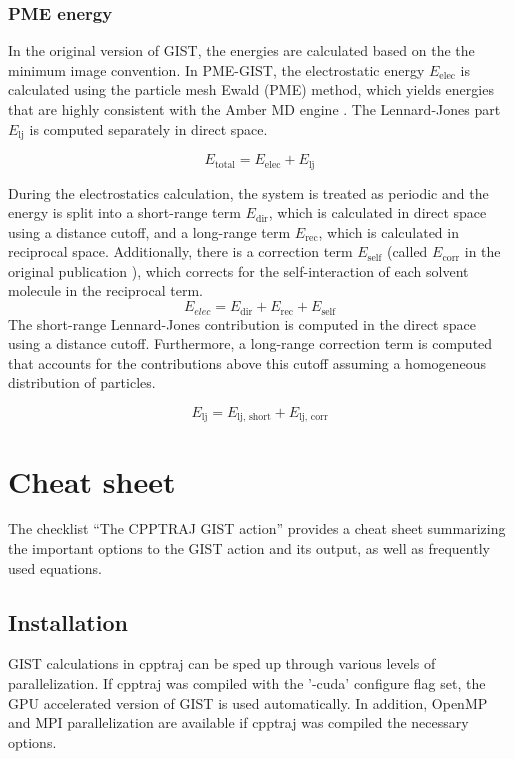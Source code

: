 \documentclass[9pt,tutorial]{livecoms}
\begin{document}
\subsubsection{PME energy}

In the original version of GIST, the energies are calculated based on the the minimum image convention.
In PME-GIST, the electrostatic energy $E_\text{elec}$ is calculated using the particle mesh Ewald (PME) method, which yields energies that are highly consistent with the Amber MD engine \cite{Chen2021}.
The Lennard-Jones part $E_\text{lj}$ is computed separately in direct space.

\begin{equation}
	E_\text{total} = E_\text{elec} + E_\text{lj}
\end{equation}

During the electrostatics calculation, the system is treated as periodic and the energy is split into a short-range term $E_\text{dir}$, which is calculated in direct space using a distance cutoff, and a long-range term $E_\text{rec}$, which is calculated in reciprocal space.
Additionally, there is a correction term $E_\text{self}$ (called $E_\text{corr}$ in the original publication \cite{Chen2021}), which corrects for the self-interaction of each solvent molecule in the reciprocal term.
\begin{equation}
	E_\textit{elec} = E_\text{dir} + E_\text{rec} + E_\text{self}
\end{equation}
The short-range Lennard-Jones contribution is computed in the direct space using a distance cutoff.
Furthermore, a long-range correction term is computed that accounts for the contributions above this cutoff assuming a homogeneous distribution of particles.

\begin{equation}
	E_\text{lj} = E_\text{lj,\ short} +  E_\text{lj,\ corr}
\end{equation}

\section{Cheat sheet}
The checklist ``The CPPTRAJ GIST action'' provides a cheat sheet summarizing the important options to the GIST action and its output, as well as frequently used equations.

\subsection{Installation}
GIST calculations in cpptraj can be sped up through various levels of 
parallelization.
If cpptraj was compiled with the '-cuda' configure flag set, the GPU accelerated version of GIST is used automatically. 
In addition, OpenMP and MPI parallelization are available if cpptraj was compiled the necessary options. 
\end{document}
